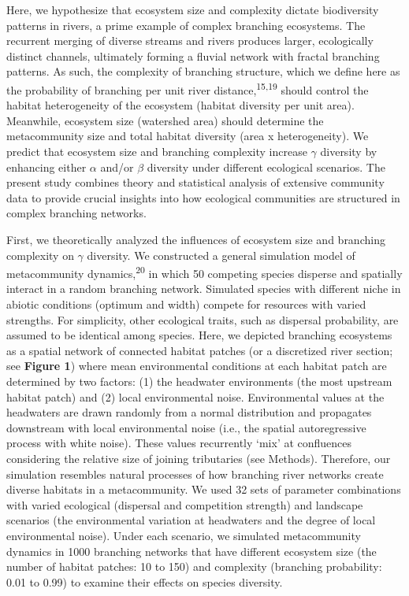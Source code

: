 \documentclass[
]{article}
\begin{document}
Here, we hypothesize that ecosystem size and complexity dictate
biodiversity patterns in rivers, a prime example of complex branching
ecosystems. The recurrent merging of diverse streams and rivers produces
larger, ecologically distinct channels, ultimately forming a fluvial
network with fractal branching patterns. As such, the complexity of
branching structure, which we define here as the probability of
branching per unit river distance,\textsuperscript{15,19} should control
the habitat heterogeneity of the ecosystem (habitat diversity per unit
area). Meanwhile, ecosystem size (watershed area) should determine the
metacommunity size and total habitat diversity (area x heterogeneity).
We predict that ecosystem size and branching complexity increase
\(\gamma\) diversity by enhancing either \(\alpha\) and/or \(\beta\)
diversity under different ecological scenarios. The present study
combines theory and statistical analysis of extensive community data to
provide crucial insights into how ecological communities are structured
in complex branching networks.

First, we theoretically analyzed the influences of ecosystem size and
branching complexity on \(\gamma\) diversity. We constructed a general
simulation model of metacommunity dynamics,\textsuperscript{20} in which
50 competing species disperse and spatially interact in a random
branching network. Simulated species with different niche in abiotic
conditions (optimum and width) compete for resources with varied
strengths. For simplicity, other ecological traits, such as dispersal
probability, are assumed to be identical among species. Here, we
depicted branching ecosystems as a spatial network of connected habitat
patches (or a discretized river section; see \textbf{Figure 1}) where
mean environmental conditions at each habitat patch are determined by
two factors: (1) the headwater environments (the most upstream habitat
patch) and (2) local environmental noise. Environmental values at the
headwaters are drawn randomly from a normal distribution and propagates
downstream with local environmental noise (i.e., the spatial
autoregressive process with white noise). These values recurrently `mix'
at confluences considering the relative size of joining tributaries (see
Methods). Therefore, our simulation resembles natural processes of how
branching river networks create diverse habitats in a metacommunity. We
used 32 sets of parameter combinations with varied ecological (dispersal
and competition strength) and landscape scenarios (the environmental
variation at headwaters and the degree of local environmental noise).
Under each scenario, we simulated metacommunity dynamics in 1000
branching networks that have different ecosystem size (the number of
habitat patches: 10 to 150) and complexity (branching probability: 0.01
to 0.99) to examine their effects on species diversity.
\end{document}
